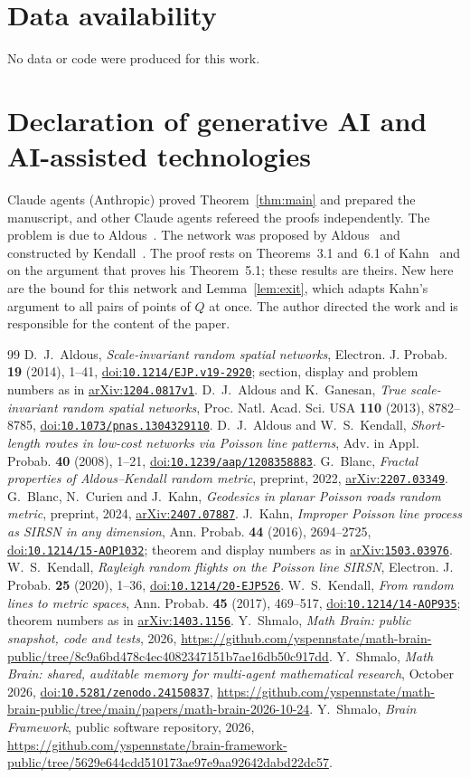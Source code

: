 \documentclass[11pt]{amsart}
\theoremstyle{remark}
\newcommand{\doi}[1]{\href{https://doi.org/#1}{doi:\nolinkurl{#1}}}
\newcommand{\arxiv}[1]{\href{https://arxiv.org/abs/#1}{arXiv:\nolinkurl{#1}}}
\begin{document}
\section*{Data availability}
No data or code were produced for this work.

\section*{Declaration of generative AI and AI-assisted technologies}
Claude agents (Anthropic) proved Theorem~\ref{thm:main} and prepared the manuscript, and other Claude agents refereed
the proofs independently. The problem is due to Aldous~\cite{Aldous}. The network was proposed by
Aldous~\cite{Aldous} and constructed by Kendall~\cite{Kendall}. The proof rests on Theorems~3.1 and~6.1 of
Kahn~\cite{Kahn} and on the argument that proves his Theorem~5.1; these results are theirs. New here are the bound
for this network and Lemma~\ref{lem:exit}, which adapts Kahn's argument to all pairs of points of $Q$ at once. The author directed the work and is responsible for
the content of the paper.

\begin{thebibliography}{99}
 D.~J.~Aldous, \emph{Scale-invariant random spatial networks}, Electron. J. Probab. \textbf{19}
(2014), 1--41, \doi{10.1214/EJP.v19-2920}; section, display and problem numbers as in \arxiv{1204.0817v1}.
 D.~J.~Aldous and K.~Ganesan, \emph{True scale-invariant random spatial networks}, Proc. Natl. Acad. Sci.
USA \textbf{110} (2013), 8782--8785, \doi{10.1073/pnas.1304329110}.
 D.~J.~Aldous and W.~S.~Kendall, \emph{Short-length routes in low-cost networks via Poisson line
patterns}, Adv. in Appl. Probab. \textbf{40} (2008), 1--21, \doi{10.1239/aap/1208358883}.
 G.~Blanc, \emph{Fractal properties of Aldous--Kendall random metric}, preprint, 2022,
\arxiv{2207.03349}.
 G.~Blanc, N.~Curien and J.~Kahn, \emph{Geodesics in planar Poisson roads random metric}, preprint,
2024, \arxiv{2407.07887}.
 J.~Kahn, \emph{Improper Poisson line process as SIRSN in any dimension}, Ann. Probab. \textbf{44}
(2016), 2694--2725, \doi{10.1214/15-AOP1032}; theorem and display numbers as in \arxiv{1503.03976}.
 W.~S.~Kendall, \emph{Rayleigh random flights on the Poisson line SIRSN}, Electron. J.
Probab. \textbf{25} (2020), 1--36, \doi{10.1214/20-EJP526}.
 W.~S.~Kendall, \emph{From random lines to metric spaces}, Ann. Probab. \textbf{45} (2017),
469--517, \doi{10.1214/14-AOP935}; theorem numbers as in \arxiv{1403.1156}.
 Y.~Shmalo, \emph{Math Brain: public snapshot, code and tests}, 2026,
\url{https://github.com/yspennstate/math-brain-public/tree/8c9a6bd478c4ec4082347151b7ae16db50c917dd}.
 Y.~Shmalo, \emph{Math Brain: shared, auditable memory for multi-agent mathematical research},
October 2026, \doi{10.5281/zenodo.24150837},
\url{https://github.com/yspennstate/math-brain-public/tree/main/papers/math-brain-2026-10-24}.
 Y.~Shmalo, \emph{Brain Framework}, public software repository, 2026,
\url{https://github.com/yspennstate/brain-framework-public/tree/5629e644cdd510173ae97e9aa92642dabd22dc57}.
\end{thebibliography}
\end{document}
